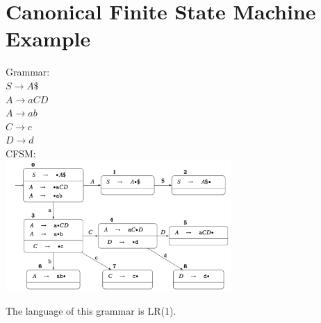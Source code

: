 
\section{Canonical Finite State Machine Example}

Grammar:\\
$S \rightarrow A\$$\\
$A \rightarrow aCD$\\
$A \rightarrow ab$\\
$C \rightarrow c$\\
$D \rightarrow d$\\

CFSM:\\
\includegraphics[height=5cm]{../images/Pasted image 20250317175419.png}

The language of this grammar is LR(1).


